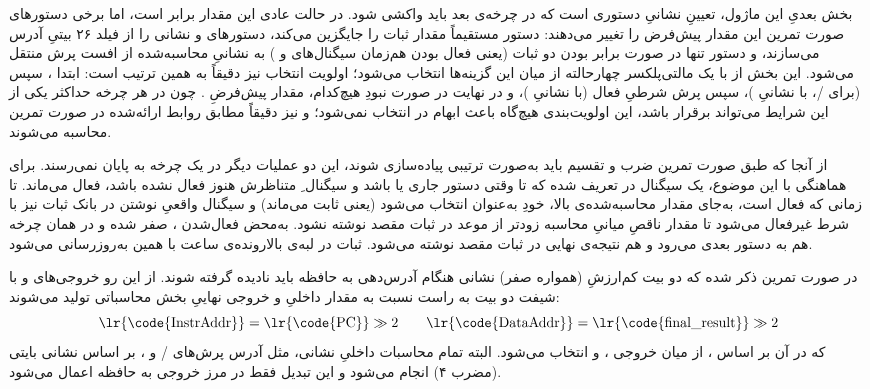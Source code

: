 بخش بعدیِ این ماژول، تعیینِ نشانیِ دستوری است که در چرخه‌ی بعد باید واکشی شود. در حالت عادی این مقدار برابر  است، اما برخی دستورهای صورت تمرین این مقدار پیش‌فرض را تغییر می‌دهند: دستور  مستقیماً مقدار ثبات  را جایگزین  می‌کند، دستورهای  و  نشانی را از فیلد ۲۶ بیتیِ آدرس می‌سازند، و دستور  تنها در صورت برابر بودن دو ثبات (یعنی فعال بودن هم‌زمان سیگنال‌های  و ) به نشانیِ محاسبه‌شده از افست پرش منتقل می‌شود. این بخش از  با یک مالتی‌پلکسر چهارحالته از میان این گزینه‌ها انتخاب می‌شود؛ اولویت انتخاب نیز دقیقاً به همین ترتیب است: ابتدا ، سپس  (برای /، با نشانیِ )، سپس پرش شرطیِ فعال (با نشانیِ )، و در نهایت در صورت نبودِ هیچ‌کدام، مقدار پیش‌فرضِ . چون در هر چرخه حداکثر یکی از این شرایط می‌تواند برقرار باشد، این اولویت‌بندی هیچ‌گاه باعث ابهام در انتخاب نمی‌شود؛  و  نیز دقیقاً مطابق روابط ارائه‌شده در صورت تمرین محاسبه می‌شوند.

از آنجا که طبق صورت تمرین ضرب و تقسیم باید به‌صورت ترتیبی پیاده‌سازی شوند، این دو عملیات دیگر در یک چرخه به پایان نمی‌رسند. برای هماهنگی با این موضوع، یک سیگنال  در  تعریف شده که تا وقتی دستور جاری  یا  باشد و سیگنال ِ متناظرش هنوز فعال نشده باشد، فعال می‌ماند. تا زمانی که  فعال است، به‌جای مقدار محاسبه‌شده‌ی بالا، خودِ  به‌عنوان  انتخاب می‌شود (یعنی  ثابت می‌ماند) و سیگنال واقعیِ نوشتن در بانک ثبات نیز با شرط  غیرفعال می‌شود تا مقدار ناقصِ میانیِ محاسبه زودتر از موعد در ثبات مقصد نوشته نشود. به‌محض فعال‌شدن ،  صفر شده و در همان چرخه هم  به دستور بعدی می‌رود و هم نتیجه‌ی نهایی در ثبات مقصد نوشته می‌شود. ثبات  در لبه‌ی بالارونده‌ی ساعت با همین  به‌روزرسانی می‌شود.

در صورت تمرین ذکر شده که دو بیت کم‌ارزشِ (همواره صفر) نشانی هنگام آدرس‌دهی به حافظه باید نادیده گرفته شوند. از این رو خروجی‌های  و  با شیفت دو بیت به راست نسبت به مقدار داخلیِ  و خروجی نهاییِ بخش محاسباتی تولید می‌شوند:
\[
    \text{\lr{\code{InstrAddr}}} = \text{\lr{\code{PC}}} \gg 2 \qquad \text{\lr{\code{DataAddr}}} = \text{\lr{\code{final\_result}}} \gg 2
\]
که در آن  بر اساس ، از میان خروجی ،  و  انتخاب می‌شود. البته تمام محاسبات داخلیِ نشانی، مثل آدرس پرش‌های / و ، بر اساس نشانی بایتی (مضرب ۴) انجام می‌شود و این تبدیل فقط در مرز خروجی به حافظه اعمال می‌شود.

